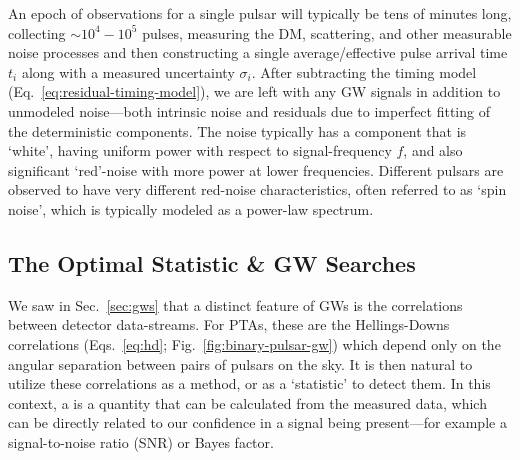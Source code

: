 \documentclass[onecolumn,authoryear]{els-mrw}
\begin{document}
An epoch of observations for a single pulsar will typically be tens of minutes long, collecting $\sim 10^4 - 10^5$ pulses, measuring the DM, scattering, and other measurable noise processes and then constructing a single average/effective pulse arrival time $t_i$ along with a measured uncertainty $\sigma_i$.  After subtracting the timing model (Eq.~\ref{eq:residual-timing-model}), we are left with any GW signals in addition to unmodeled noise---both intrinsic noise and residuals due to imperfect fitting of the deterministic components.  The noise typically has a component that is `white', having uniform power with respect to signal-frequency $f$, and also significant `red'-noise with more power at lower frequencies.  Different pulsars are observed to have very different red-noise characteristics, often referred to as `spin noise', which is typically modeled as a power-law spectrum.

\subsection{The Optimal Statistic \& GW Searches}\label{sec:os}


We saw in Sec.~\ref{sec:gws} that a distinct feature of GWs is the correlations between detector data-streams.  For PTAs, these are the Hellings-Downs correlations (Eqs.~\ref{eq:hd}; Fig.~\ref{fig:binary-pulsar-gw}) which depend only on the angular separation between pairs of pulsars on the sky.  It is then natural to utilize these correlations as a method, or as a `statistic' to detect them.  In this context, a  is a quantity that can be calculated from the measured data, which can be directly related to our confidence in a signal being present---for example a signal-to-noise ratio (SNR) or Bayes factor.
\end{document}
